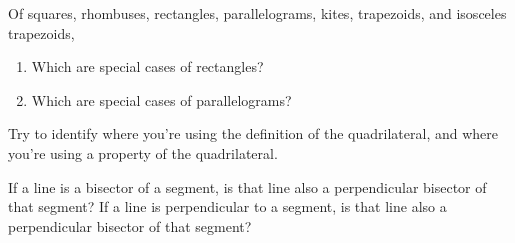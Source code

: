 \documentclass{ximera}
\begin{document}
\newpage
\begin{problem}  
Of squares, rhombuses, rectangles, parallelograms, kites, trapezoids, and isosceles trapezoids, 
\begin{enumerate}
    \item   Which are special cases of rectangles?
    \item Which are special cases of parallelograms? 
\end{enumerate}

Try to identify where you're using the definition of the quadrilateral, and where you're using a property of the quadrilateral.
\end{problem}




\begin{problem} If a line is a bisector of a segment, is that line also a perpendicular bisector of that segment?  If a line is perpendicular to a segment, is that line also a perpendicular bisector of that segment? 





\end{problem}
\end{document}
